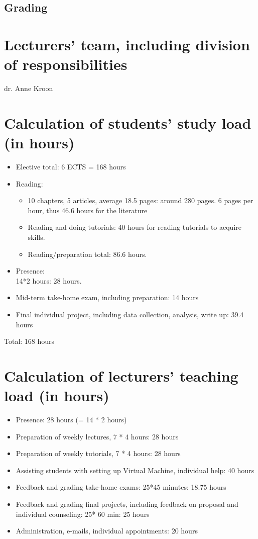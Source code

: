 \documentclass[a4paper,12pt]{report}
\begin{document}
\endgroup

\section*{Grading}


\chapter{Lecturers' team, including division of responsibilities}
dr. Anne Kroon


\chapter{Calculation of students' study load (in hours)}
\begin{itemize}

\item Elective total: 6 ECTS = 168 hours
\item Reading: 
\begin{itemize}
\item 10 chapters, 5 articles, average 18.5 pages: around 280 pages. 6 pages per hour, thus 46.6 hours for the literature
\item Reading and doing tutorials: 40 hours for reading tutorials to acquire skills.
\item Reading/preparation total: 86.6 hours.
\end{itemize}
\item Presence: \\14*2 hours: 28 hours.
\item Mid-term take-home exam, including preparation: 14 hours
\item Final individual project, including data collection, analysis, write up: 39.4 hours
\end{itemize}

Total: 168 hours


\chapter{Calculation of lecturers' teaching load (in hours)}

\begin{itemize}
\item Presence: 28 hours (= 14 * 2 hours)
\item Preparation of weekly lectures, 7 * 4 hours: 28 hours
\item Preparation of weekly tutorials, 7 * 4 hours: 28 hours
\item Assisting students with setting up Virtual Machine, individual help: 40 hours
\item Feedback and grading take-home exams: 25*45 minutes: 18.75 hours
\item Feedback and grading final projects, including feedback on proposal and individual counseling: 25* 60 min: 25 hours 
\item Administration, e-mails, individual appointments: 20 hours
\end{itemize}
\end{document}
